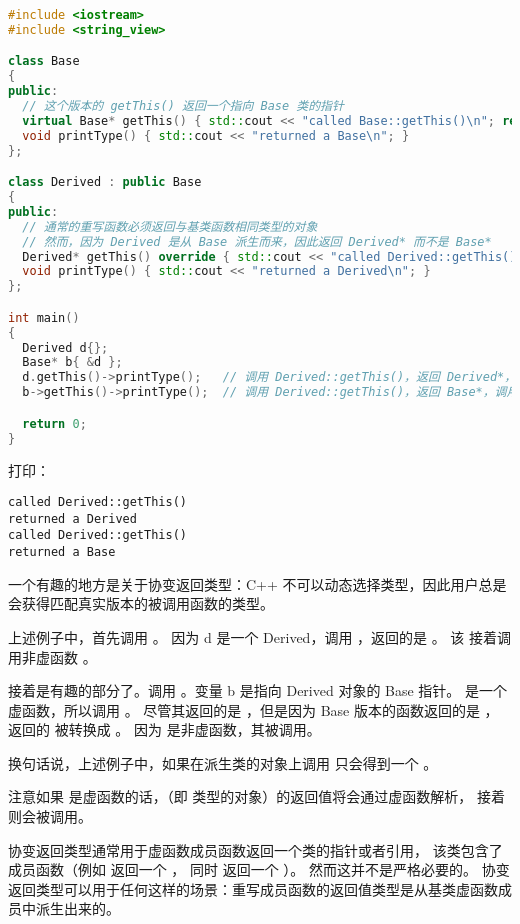 \documentclass[../../LearnCpp.tex]{subfiles}
\begin{document}
\begin{lstlisting}[language=C++]
#include <iostream>
#include <string_view>

class Base
{
public:
  // 这个版本的 getThis() 返回一个指向 Base 类的指针
  virtual Base* getThis() { std::cout << "called Base::getThis()\n"; return this; }
  void printType() { std::cout << "returned a Base\n"; }
};

class Derived : public Base
{
public:
  // 通常的重写函数必须返回与基类函数相同类型的对象
  // 然而，因为 Derived 是从 Base 派生而来，因此返回 Derived* 而不是 Base*
  Derived* getThis() override { std::cout << "called Derived::getThis()\n";  return this; }
  void printType() { std::cout << "returned a Derived\n"; }
};

int main()
{
  Derived d{};
  Base* b{ &d };
  d.getThis()->printType();   // 调用 Derived::getThis()，返回 Derived*，调用 Derived::printType
  b->getThis()->printType();  // 调用 Derived::getThis()，返回 Base*，调用 Base::printType

  return 0;
}
\end{lstlisting}

打印：

\begin{lstlisting}
called Derived::getThis()
returned a Derived
called Derived::getThis()
returned a Base
\end{lstlisting}

一个有趣的地方是关于协变返回类型：C++ 不可以动态选择类型，因此用户总是会获得匹配真实版本的被调用函数的类型。

上述例子中，首先调用 。
因为 d 是一个 Derived，调用 ，返回的是 。
该  接着调用非虚函数 。

接着是有趣的部分了。调用 。变量 b 是指向 Derived 对象的 Base 指针。
 是一个虚函数，所以调用 。
尽管其返回的是 ，但是因为 Base 版本的函数返回的是 ，
返回的  被转换成 。
因为  是非虚函数，其被调用。

换句话说，上述例子中，如果在派生类的对象上调用  只会得到一个 。

注意如果  是虚函数的话，（即  类型的对象）的返回值将会通过虚函数解析，
接着  则会被调用。

协变返回类型通常用于虚函数成员函数返回一个类的指针或者引用，
该类包含了成员函数（例如  返回一个 ，
同时  返回一个 ）。
然而这并不是严格必要的。
协变返回类型可以用于任何这样的场景：重写成员函数的返回值类型是从基类虚函数成员中派生出来的。
\end{document}
